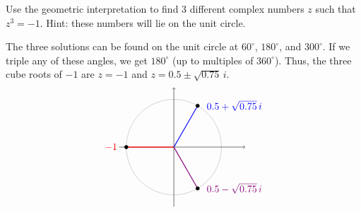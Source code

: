 \begin{ex}
  Use the geometric interpretation to find 3 different complex numbers
  $z$ such that $z^3 = -1$. Hint: these numbers will lie on the unit
  circle.
  \begin{sol}
    The three solutions can be found on the unit circle at
    $60^{\circ}$, $180^{\circ}$, and $300^{\circ}$. If we triple any
    of these angles, we get $180^{\circ}$ (up to multiples of $360^{\circ}$).
    Thus, the three cube roots of $-1$ are $z=-1$ and $z=0.5\pm\sqrt{0.75}\,i$.
    \begin{equation*}
      \begin{tikzpicture}[scale=1.7]
        \draw[black!30] (0,0) circle (1);
        \draw[->](-1.15,0) -- (1.5,0);
        \draw[->](0,-1.25) -- (0,1.25);
        \draw[thick, blue] (0,0) -- (60:1);
        \draw[thick, red] (0,0) -- (180:1);
        \draw[thick, purple!70!blue] (0,0) -- (300:1);
        \draw[fill, black] (60:1) circle [radius=1.06pt] node [right=2mm,blue] {$0.5+\sqrt{0.75}\,i$};
        \draw[fill, black] (180:1) circle [radius=1.06pt] node [left=2mm,red] {$-1$};
        \draw[fill, black] (300:1) circle [radius=1.06pt] node [right=2mm,purple!70!blue] {$0.5-\sqrt{0.75}\,i$};
      \end{tikzpicture}
    \end{equation*}
  \end{sol}
\end{ex}

